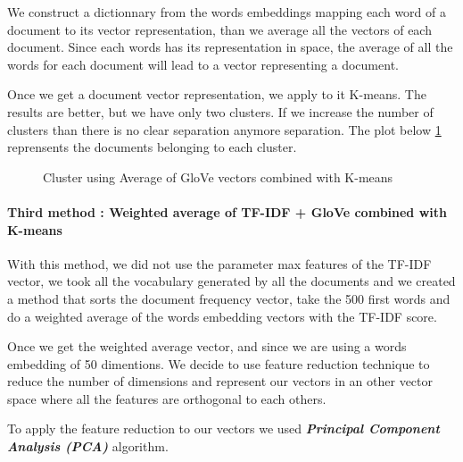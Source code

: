 \documentclass[journal,twocolumn]{IEEEtran}
\begin{document}
We construct a dictionnary from the words embeddings mapping each word
of a document to its vector representation, than we average all the
vectors of each document. Since each words has its representation in
space, the average of all the words for each document will lead to a
vector representing a document.

Once we get a document vector representation, we apply to it K-means.
The results are better, but we have only two clusters. If we increase
the number of clusters than there is no clear separation anymore
separation. The plot below \ref{fig4} reprensents the documents
belonging to each cluster.


    \begin{figure}
        \begin{center}\end{center}
        \caption{Cluster using Average of GloVe vectors combined with K-means }
        \label{fig4}
    \end{figure}
    
    \hypertarget{third-method-weighted-average-of-tf-idf-glove-combined-with-k-means}{%
\paragraph{Third method : Weighted average of TF-IDF + GloVe combined
with
K-means}\label{third-method-weighted-average-of-tf-idf-glove-combined-with-k-means}}

With this method, we did not use the parameter max features of the
TF-IDF vector, we took all the vocabulary generated by all the documents
and we created a method that sorts the document frequency vector, take
the 500 first words and do a weighted average of the words embedding
vectors with the TF-IDF score.

Once we get the weighted average vector, and since we are using a words
embedding of 50 dimentions. We decide to use feature reduction technique
to reduce the number of dimensions and represent our vectors in an other
vector space where all the features are orthogonal to each others.

To apply the feature reduction to our vectors we used
\textbf{\emph{Principal Component Analysis (PCA)}} algorithm.
\end{document}
